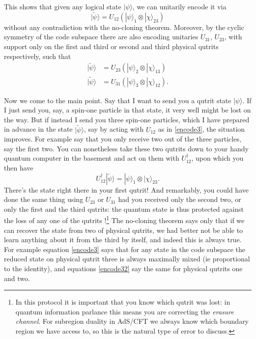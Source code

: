 \documentclass[toc]{PoS}
\newcommand{\be}{\begin{equation}}
\newcommand{\ee}{\end{equation}}
\newcommand{\ran}{\rangle}
\newcommand{\wt}{\widetilde}
\begin{document}
This shows that given any logical state $|\psi\ran$, we can unitarily encode it via
\be\label{encode3}
|\wt{\psi}\ran=U_{12}\left(|\psi\ran_1\otimes |\chi\ran_{23}\right)
\ee
without any contradiction with the no-cloning theorem.  Moreover, by the cyclic symmetry of the code subspace there are also encoding unitaries $U_{31}$, $U_{23}$, with support only on the first and third or second and third physical qutrits respectively, such that 
\begin{align}\nonumber
|\wt{\psi}\ran&=U_{23}\left(|\psi\ran_2\otimes |\chi\ran_{13}\right)\\
|\wt{\psi}\ran&=U_{31}\left(|\psi\ran_3\otimes |\chi\ran_{12}\right).\label{encode32}
\end{align} 

Now we come to the main point.  Say that I want to send you a qutrit state $|\psi\ran$.  If I just send you, say,  a spin-one particle in that state, it very well might be lost on the way.  But if instead I send you three spin-one particles, which I have prepared in advance in the state $|\wt{\psi}\ran$, say by acting with $U_{12}$ as in \eqref{encode3}, the situation improves.  For example say that you only receive two out of the three particles, say the first two.  You can nonetheless take these two qutrits down to your handy quantum computer in the basement and act on them with $U_{12}^\dagger$, upon which you then have
\be
U_{12}^\dagger|\wt{\psi}\ran=|\psi\ran_1\otimes |\chi\ran_{23}.
\ee
There's the state right there in your first qutrit! And remarkably, you could have done the same thing using $U_{23}$ or $U_{31}$ had you received only the second two, or only the first and the third qutrits: the quantum state is thus protected against the loss of any one of the qutrits \cite{Cleve:1999qg}!\footnote{In this protocol it is important that you know which qutrit was lost: in quantum information parlance this means you are correcting the \textit{erasure channel}.  For subregion duality in AdS/CFT we always know which boundary region we have access to, so this is the natural type of error to discuss.}  The no-cloning theorem says only that if we can recover the state from two of physical qutrits, we had better not be able to learn anything about it from the third by itself, and indeed this is always true.  For example equation \eqref{encode3} says that for any state in the code subspace the reduced state on physical qutrit three is always maximally mixed (ie proportional to the identity), and equations \eqref{encode32} say the same for physical qutrits one and two.  
\end{document}
